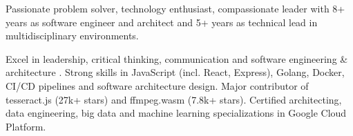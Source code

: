 

\begin{cvparagraph}

Passionate problem solver, technology enthusiast, compassionate leader with 8+ years as software engineer and architect and 5+ years as technical lead in multidisciplinary environments.

  Excel in leadership, critical thinking, communication and software engineering \& architecture . Strong skills in JavaScript (incl. React, Express), Golang, Docker, CI/CD pipelines and software architecture design. Major contributor of tesseract.js (27k+ stars) and ffmpeg.wasm (7.8k+ stars). Certified architecting, data engineering, big data and machine learning specializations in Google Cloud Platform. 
\end{cvparagraph}
